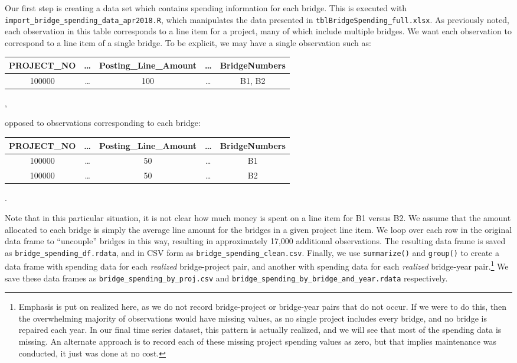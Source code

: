 \documentclass{article}
\begin{document}
Our first step is creating a data set which contains spending information for each bridge. This is executed with \texttt{import\_bridge\_spending\_data\_apr2018.R}, which manipulates 
the data presented in \texttt{tblBridgeSpending\_full.xlsx}. As previously noted, each observation in this table corresponds to a line item for a project, many of which include multiple bridges. We want each observation to correspond to a line item of a single bridge. To be explicit, we may have a single observation such as: 
\begin{center}
\begin{tabular}{ccccc}
	PROJECT\_NO & \ldots &Posting\_Line\_Amount & \ldots & BridgeNumbers \\ \hline
	100000      & \ldots & 100               & \ldots     & B1, B2       
\end{tabular},
\end{center}
opposed to observations corresponding to each bridge: 
\begin{center}
	\begin{tabular}{ccccc}
		PROJECT\_NO & \ldots &Posting\_Line\_Amount & \ldots & BridgeNumbers \\ \hline
		100000      & \ldots & 50               & \ldots     & B1    \\   100000      & \ldots & 50               & \ldots     & B2
	\end{tabular}.
\end{center}
Note that in this particular situation, it is not clear how much money is spent on a line item for B1 versus B2. We assume that the amount allocated to each bridge is simply the average line amount for the bridges in a given project line item. We loop over each row in the original data frame to ``uncouple'' bridges in this way, resulting in approximately 17,000 additional observations. The resulting data frame is saved as \texttt{bridge\_spending\_df.rdata}, and in CSV form as \texttt{bridge\_spending\_clean.csv}. Finally, we use \texttt{summarize()} and \texttt{group()} to create a data frame with spending data for each \textit{realized} bridge-project pair, and another with spending data for each \textit{realized} bridge-year pair.\footnote{Emphasis is put on realized here, as we do not record bridge-project or bridge-year pairs that do not occur. If we were to do this, then the overwhelming majority of observations would have missing values, as no single project includes every bridge, and no bridge is repaired each year. In our final time series dataset, this pattern is actually realized, and we will see that most of the spending data is missing. An alternate approach is to record each of these missing project spending values as zero, but that implies maintenance was conducted, it just was done at no cost.} We save these data frames as \texttt{bridge\_spending\_by\_proj.csv} and \texttt{bridge\_spending\_by\_bridge\_and\_year.rdata} respectively.
\end{document}
